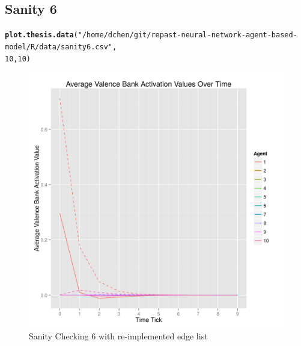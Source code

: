 \documentclass{article}\usepackage[]{graphicx}\usepackage[]{color}
\makeatletter
\def\maxwidth{ %
  \ifdim\Gin@nat@width>\linewidth
    \linewidth
  \else
    \Gin@nat@width
  \fi
}
\newcommand{\hlnum}[1]{\textcolor[rgb]{0.686,0.059,0.569}{#1}}%
\newcommand{\hlstr}[1]{\textcolor[rgb]{0.192,0.494,0.8}{#1}}%
\newcommand{\hlstd}[1]{\textcolor[rgb]{0.345,0.345,0.345}{#1}}%
\newcommand{\hlkwd}[1]{\textcolor[rgb]{0.737,0.353,0.396}{\textbf{#1}}}%
\newenvironment{kframe}{%
 \def\at@end@of@kframe{}%
 \ifinner\ifhmode%
  \def\at@end@of@kframe{\end{minipage}}%
  \begin{minipage}{\columnwidth}%
 \fi\fi%
 \def\FrameCommand##1{\hskip\@totalleftmargin \hskip-\fboxsep
 \colorbox{shadecolor}{##1}\hskip-\fboxsep
     \hskip-\linewidth \hskip-\@totalleftmargin \hskip\columnwidth}%
 \MakeFramed {\advance\hsize-\width
   \@totalleftmargin\z@ \linewidth\hsize
   \@setminipage}}%
 {\par\unskip\endMakeFramed%
 \at@end@of@kframe}
\newenvironment{knitrout}{}{} %
\makeatother
\begin{document}
\subsection{Sanity 6}
\begin{knitrout}
\color{fgcolor}\begin{kframe}
\begin{alltt}
\hlkwd{plot.thesis.data}\hlstd{(}\hlstr{"/home/dchen/git/repast-neural-network-agent-based-model/R/data/sanity6.csv"}\hlstd{,}
    \hlnum{10}\hlstd{,} \hlnum{10}\hlstd{)}
\end{alltt}
\end{kframe}\begin{figure}[]

\includegraphics[width=\maxwidth]{figure/plot-sanity-6} \caption[Sanity Checking 6 with re-implemented edge list]{Sanity Checking 6 with re-implemented edge list\label{fig:plot-sanity-6}}
\end{figure}


\end{knitrout}


\newpage
\end{document}

